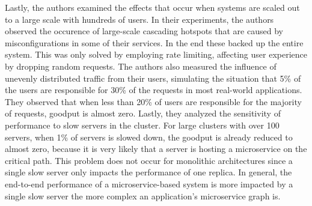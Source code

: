 \documentclass[10pt]{article}
\begin{document}
	Lastly, the authors examined the effects that occur when systems are scaled out to a large scale with hundreds of users. In their experiments, the authors observed the occurence of large-scale cascading hotspots that are caused by misconfigurations in some of their services. In the end these backed up the entire system. This was only solved by employing rate limiting, affecting user experience by dropping random requests. The authors also measured the influence of unevenly distributed traffic from their users, simulating the situation that 5\% of the users are responsible for 30\% of the requests in most real-world applications. They observed that when less than 20\% of users are responsible for the majority of requests, goodput is almost zero. Lastly, they analyzed the sensitivity of performance to slow servers in the cluster. For large clusters with over 100 servers, when 1\% of servers is slowed down, the goodput is already reduced to almost zero, because it is very likely that a server is hosting a microservice on the critical path. This problem does not occur for monolithic architectures since a single slow server only impacts the performance of one replica. In general, the end-to-end performance of a microservice-based system is more impacted by a single slow server the more complex an application's microservice graph is.
	
\end{document}

